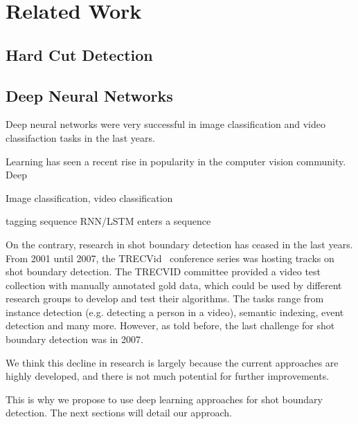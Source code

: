 \section{Related Work}
\label{sec:related_work}

\subsection{Hard Cut Detection}

\subsection{Deep Neural Networks}
Deep neural networks were very successful in image classification and video classifaction tasks in the last years.

Learning has seen a recent rise in popularity in the computer vision community.
Deep 

Image classification, video classification

tagging sequence
RNN/LSTM
enters a sequence


On the contrary, research in shot boundary detection has ceased in the last years.
From 2001 until 2007, the TRECVid~\cite{trecvid} conference series was hosting tracks on shot boundary detection.
The TRECVID committee provided a video test collection with manually annotated gold data, which could be used by different research groups to develop and test their algorithms.
The tasks range from instance detection (e.g. detecting a person in a video), semantic indexing, event detection and many more.
However, as told before, the last challenge for shot boundary detection was in 2007.

We think this decline in research is largely because the current approaches are highly developed, and there is not much potential for further improvements.

This is why we propose to use deep learning approaches for shot boundary detection.
The next sections will detail our approach. 


